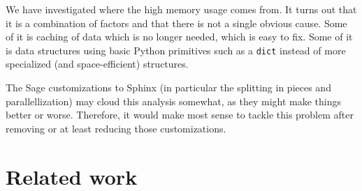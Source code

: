 \documentclass{deliverablereport}
\begin{document}

We have investigated where the high memory usage comes from.
It turns out that it is a combination of factors
and that there is not a single obvious cause.
Some of it is caching of data which is no longer needed,
which is easy to fix.
Some of it is data structures using basic Python primitives such as a \texttt{dict}
instead of more specialized (and space-efficient) structures.

The Sage customizations to Sphinx
(in particular the splitting in pieces and parallellization)
may cloud this analysis somewhat,
as they might make things better or worse.
Therefore, it would make most sense to tackle this problem after
removing or at least reducing those customizations.

\section{Related work}



\end{document}

